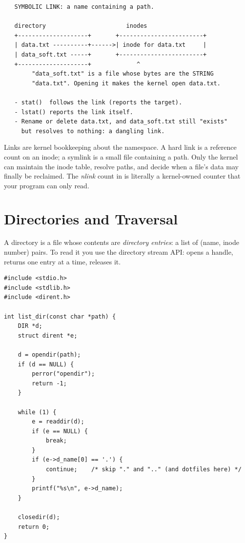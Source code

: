\begin{verbatim}
   SYMBOLIC LINK: a name containing a path.

   directory                       inodes
   +--------------------+       +------------------------+
   | data.txt ----------+------>| inode for data.txt     |
   | data_soft.txt -----+       +------------------------+
   +--------------------+             ^
        "data_soft.txt" is a file whose bytes are the STRING
        "data.txt". Opening it makes the kernel open data.txt.

   - stat()  follows the link (reports the target).
   - lstat() reports the link itself.
   - Rename or delete data.txt, and data_soft.txt still "exists"
     but resolves to nothing: a dangling link.
\end{verbatim}

\begin{osconcept}
Links are kernel bookkeeping about the namespace. A hard link is a
reference count on an inode; a symlink is a small file containing a
path. Only the kernel can maintain the inode table, resolve paths,
and decide when a file's data may finally be reclaimed. The \emph{nlink}
count in  is literally a kernel-owned counter that your
program can only read.
\end{osconcept}

\section{Directories and Traversal}

A directory is a file whose contents are \emph{directory entries}: a
list of (name, inode number) pairs. To read it you use the directory
stream API:  opens a handle,  returns one
entry at a time,  releases it.

\begin{lstlisting}[caption={Listing a directory, entry by entry.}]
#include <stdio.h>
#include <stdlib.h>
#include <dirent.h>

int list_dir(const char *path) {
    DIR *d;
    struct dirent *e;

    d = opendir(path);
    if (d == NULL) {
        perror("opendir");
        return -1;
    }

    while (1) {
        e = readdir(d);
        if (e == NULL) {
            break;
        }
        if (e->d_name[0] == '.') {
            continue;    /* skip "." and ".." (and dotfiles here) */
        }
        printf("%s\n", e->d_name);
    }

    closedir(d);
    return 0;
}
\end{lstlisting}

